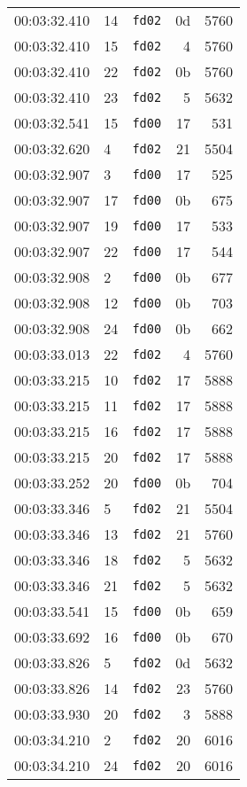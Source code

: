 \documentclass{article}
\begin{document}
\begin{longtable}{lllrr}
00:03:32.410 & 14 & \texttt{fd02} & 0d & 5760 \\
00:03:32.410 & 15 & \texttt{fd02} & 4 & 5760 \\
00:03:32.410 & 22 & \texttt{fd02} & 0b & 5760 \\
00:03:32.410 & 23 & \texttt{fd02} & 5 & 5632 \\
00:03:32.541 & 15 & \texttt{fd00} & 17 & 531 \\
00:03:32.620 & 4 & \texttt{fd02} & 21 & 5504 \\
00:03:32.907 & 3 & \texttt{fd00} & 17 & 525 \\
00:03:32.907 & 17 & \texttt{fd00} & 0b & 675 \\
00:03:32.907 & 19 & \texttt{fd00} & 17 & 533 \\
00:03:32.907 & 22 & \texttt{fd00} & 17 & 544 \\
00:03:32.908 & 2 & \texttt{fd00} & 0b & 677 \\
00:03:32.908 & 12 & \texttt{fd00} & 0b & 703 \\
00:03:32.908 & 24 & \texttt{fd00} & 0b & 662 \\
00:03:33.013 & 22 & \texttt{fd02} & 4 & 5760 \\
00:03:33.215 & 10 & \texttt{fd02} & 17 & 5888 \\
00:03:33.215 & 11 & \texttt{fd02} & 17 & 5888 \\
00:03:33.215 & 16 & \texttt{fd02} & 17 & 5888 \\
00:03:33.215 & 20 & \texttt{fd02} & 17 & 5888 \\
00:03:33.252 & 20 & \texttt{fd00} & 0b & 704 \\
00:03:33.346 & 5 & \texttt{fd02} & 21 & 5504 \\
00:03:33.346 & 13 & \texttt{fd02} & 21 & 5760 \\
00:03:33.346 & 18 & \texttt{fd02} & 5 & 5632 \\
00:03:33.346 & 21 & \texttt{fd02} & 5 & 5632 \\
00:03:33.541 & 15 & \texttt{fd00} & 0b & 659 \\
00:03:33.692 & 16 & \texttt{fd00} & 0b & 670 \\
00:03:33.826 & 5 & \texttt{fd02} & 0d & 5632 \\
00:03:33.826 & 14 & \texttt{fd02} & 23 & 5760 \\
00:03:33.930 & 20 & \texttt{fd02} & 3 & 5888 \\
00:03:34.210 & 2 & \texttt{fd02} & 20 & 6016 \\
00:03:34.210 & 24 & \texttt{fd02} & 20 & 6016 \\

\end{longtable}
\end{document}
